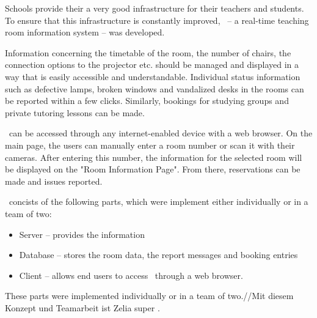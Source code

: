     Schools provide their a very good infrastructure for their teachers and students. 
    To ensure that this infrastructure is constantly improved, \ZELIA\ -- a real-time teaching room information system -- was developed.
    
    Information concerning the timetable of the room, the number of chairs, the con\-nec\-tion options to the projector etc. should be managed and displayed in a way that is easily accessible and understandable.
    Individual status information such as defective lamps, broken windows and vandalized desks in the rooms can be reported within a few clicks.
    Similarly, bookings for studying groups and private tutoring lessons can be made.
    
    \ZELIA\ can be accessed through any internet-enabled device with a web browser. 
    On the main page, the users can manually enter a room number or scan it with their cameras. 
    After entering this number, the information for the selected room will be displayed on the "Room Information Page". 
    From there, reservations can be made and issues reported.
    
    \ZELIA\ concists of the following parts, which were implement either individually or in a team of two:
    \begin{itemize}
        \item Server -- provides the information
        \item Database -- stores the room data, the report messages and booking entries
        \item Client -- allows end users to access \ZELIA\ through a web browser.
    \end{itemize}
    
    These parts were implemented individually or in a team of two.//Mit diesem Konzept und Teamarbeit ist Zelia super .
